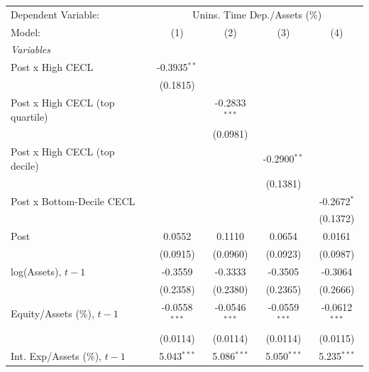 
\begingroup
\centering
\begin{tabular}{lcccc}
   \tabularnewline \midrule \midrule
   Dependent Variable: & \multicolumn{4}{c}{Unins. Time Dep./Assets (\%)}\\
   Model:                          & (1)             & (2)             & (3)             & (4)\\  
   \midrule
   \emph{Variables}\\
   Post x High CECL                & -0.3935$^{**}$  &                 &                 &   \\   
                                   & (0.1815)        &                 &                 &   \\   
   Post x High CECL (top quartile) &                 & -0.2833$^{***}$ &                 &   \\   
                                   &                 & (0.0981)        &                 &   \\   
   Post x High CECL (top decile)   &                 &                 & -0.2900$^{**}$  &   \\   
                                   &                 &                 & (0.1381)        &   \\   
   Post x Bottom-Decile CECL       &                 &                 &                 & -0.2672$^{*}$\\   
                                   &                 &                 &                 & (0.1372)\\   
   Post                            & 0.0552          & 0.1110          & 0.0654          & 0.0161\\   
                                   & (0.0915)        & (0.0960)        & (0.0923)        & (0.0987)\\   
   log(Assets), $t{-}1$            & -0.3559         & -0.3333         & -0.3505         & -0.3064\\   
                                   & (0.2358)        & (0.2380)        & (0.2365)        & (0.2666)\\   
   Equity/Assets (\%), $t{-}1$     & -0.0558$^{***}$ & -0.0546$^{***}$ & -0.0559$^{***}$ & -0.0612$^{***}$\\   
                                   & (0.0114)        & (0.0114)        & (0.0114)        & (0.0115)\\   
   Int. Exp/Assets (\%), $t{-}1$   & 5.043$^{***}$   & 5.086$^{***}$   & 5.050$^{***}$   & 5.235$^{***}$\\   

\end{tabular}
